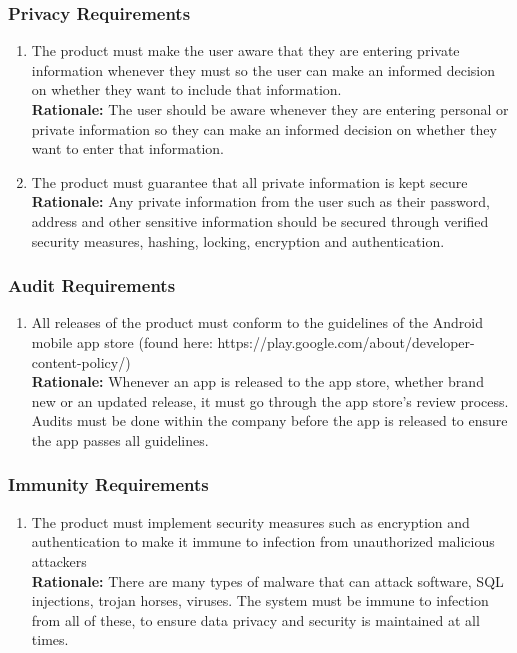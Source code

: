 \documentclass[]{article}
\begin{document}
\subsubsection{Privacy Requirements}
\label{ssub:privacy_requirements}
\begin{enumerate}[{SR-P}1. ]
	\item The product must make the user aware that they are entering private information whenever they must so the user can make an informed decision on whether they want to include that information. \\
	{\bf Rationale:} The user should be aware whenever they are entering personal or private information so they can make an informed decision on whether they want to enter that information.
	\item The product must guarantee that all private information is kept secure \\
	{\bf Rationale:} Any private information from the user such as their password, address and other sensitive information should be secured through verified security measures, hashing, locking, encryption and authentication.
\end{enumerate}

\subsubsection{Audit Requirements}
\label{ssub:audit_requirements}
\begin{enumerate}[{SR-AU}1. ]
	\item All releases of the product must conform to the guidelines of the Android mobile app store (found here: https://play.google.com/about/developer-content-policy/) \\
	{\bf Rationale:} Whenever an app is released to the app store, whether brand new or an updated release, it must go through the app store's review process. Audits must be done within the company before the app is released to ensure the app passes all guidelines.
\end{enumerate}

\subsubsection{Immunity Requirements}
\label{ssub:immunity_requirements}
\begin{enumerate}[{SR-IM}1. ]
	\item The product must implement security measures such as encryption and authentication to make it immune to infection from unauthorized malicious attackers \\
	{\bf Rationale:} There are many types of malware that can attack software, SQL injections, trojan horses, viruses. The system must be immune to infection from all of these, to ensure data privacy and security is maintained at all times.
\end{enumerate}
\end{document}

